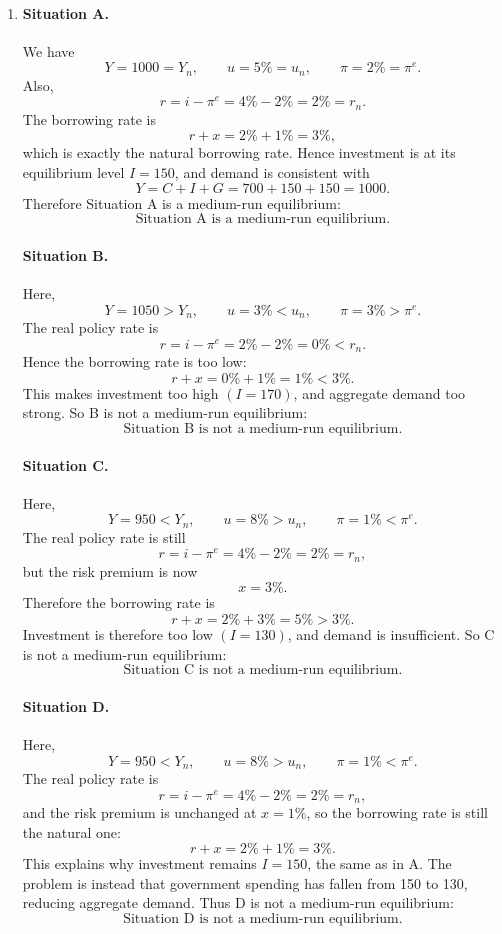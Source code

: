 \documentclass[12pt]{article}
\begin{document}
\begin{enumerate}[label=(\alph*)]
    \item
    \paragraph{Situation A.}
    We have
    \[
    Y=1000=Y_n,\qquad u=5\%=u_n,\qquad \pi=2\%=\pi^e.
    \]
    Also,
    \[
    r=i-\pi^e=4\%-2\%=2\%=r_n.
    \]
    The borrowing rate is
    \[
    r+x=2\%+1\%=3\%,
    \]
    which is exactly the natural borrowing rate. Hence investment is at its equilibrium level \(I=150\), and demand is consistent with
    \[
    Y=C+I+G=700+150+150=1000.
    \]
    Therefore Situation A is a medium-run equilibrium:
    \[
    \boxed{\text{Situation A is a medium-run equilibrium.}}
    \]

    \paragraph{Situation B.}
    Here,
    \[
    Y=1050>Y_n,\qquad u=3\%<u_n,\qquad \pi=3\%>\pi^e.
    \]
    The real policy rate is
    \[
    r=i-\pi^e=2\%-2\%=0\%<r_n.
    \]
    Hence the borrowing rate is too low:
    \[
    r+x=0\%+1\%=1\%<3\%.
    \]
    This makes investment too high \((I=170)\), and aggregate demand too strong. So B is not a medium-run equilibrium:
    \[
    \boxed{\text{Situation B is not a medium-run equilibrium.}}
    \]

    \paragraph{Situation C.}
    Here,
    \[
    Y=950<Y_n,\qquad u=8\%>u_n,\qquad \pi=1\%<\pi^e.
    \]
    The real policy rate is still
    \[
    r=i-\pi^e=4\%-2\%=2\%=r_n,
    \]
    but the risk premium is now
    \[
    x=3\%.
    \]
    Therefore the borrowing rate is
    \[
    r+x=2\%+3\%=5\%>3\%.
    \]
    Investment is therefore too low \((I=130)\), and demand is insufficient. So C is not a medium-run equilibrium:
    \[
    \boxed{\text{Situation C is not a medium-run equilibrium.}}
    \]

    \paragraph{Situation D.}
    Here,
    \[
    Y=950<Y_n,\qquad u=8\%>u_n,\qquad \pi=1\%<\pi^e.
    \]
    The real policy rate is
    \[
    r=i-\pi^e=4\%-2\%=2\%=r_n,
    \]
    and the risk premium is unchanged at \(x=1\%\), so the borrowing rate is still the natural one:
    \[
    r+x=2\%+1\%=3\%.
    \]
    This explains why investment remains \(I=150\), the same as in A. The problem is instead that government spending has fallen from 150 to 130, reducing aggregate demand. Thus D is not a medium-run equilibrium:
    \[
    \boxed{\text{Situation D is not a medium-run equilibrium.}}
    \]


\end{enumerate}
\end{document}
